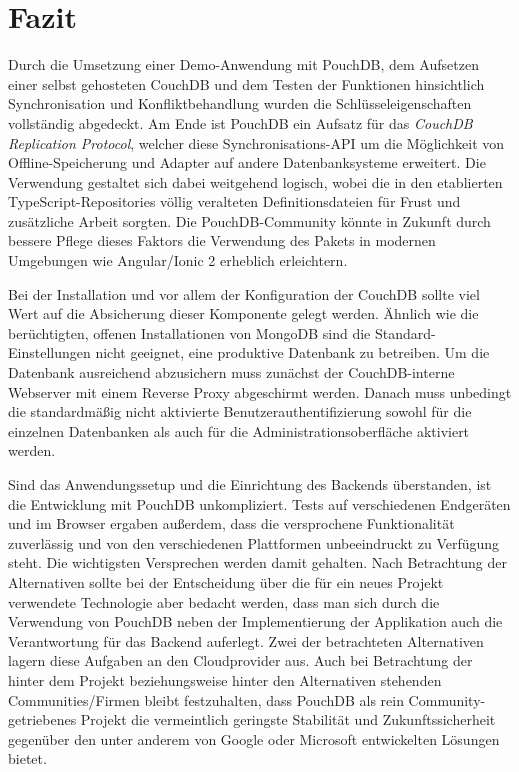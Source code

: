 \chapter{Fazit}
\label{Fazit}
Durch die Umsetzung einer Demo-Anwendung mit PouchDB, dem Aufsetzen einer selbst gehosteten CouchDB und dem Testen der Funktionen hinsichtlich Synchronisation und Konfliktbehandlung wurden die Schlüsseleigenschaften vollständig abgedeckt. Am Ende ist PouchDB ein Aufsatz für das \emph{CouchDB Replication Protocol}, welcher diese Synchronisations-API um die Möglichkeit von Offline-Speicherung und Adapter auf andere Datenbanksysteme erweitert. Die Verwendung gestaltet sich dabei weitgehend logisch, wobei die in den etablierten TypeScript-Repositories völlig veralteten Definitionsdateien für Frust und zusätzliche Arbeit sorgten. Die PouchDB-Community könnte in Zukunft durch bessere Pflege dieses Faktors die Verwendung des Pakets in modernen Umgebungen wie Angular/Ionic 2 erheblich erleichtern.

Bei der Installation und vor allem der Konfiguration der CouchDB sollte viel Wert auf die Absicherung dieser Komponente gelegt werden. Ähnlich wie die berüchtigten, offenen Installationen von MongoDB sind die Standard-Einstellungen nicht geeignet, eine produktive Datenbank zu betreiben. Um die Datenbank ausreichend abzusichern muss zunächst der CouchDB-interne Webserver mit einem Reverse Proxy abgeschirmt werden. Danach muss unbedingt die standardmäßig nicht aktivierte Benutzerauthentifizierung sowohl für die einzelnen Datenbanken als auch für die Administrationsoberfläche aktiviert werden.

Sind das Anwendungssetup und die Einrichtung des Backends überstanden, ist die Entwicklung mit PouchDB unkompliziert. Tests auf verschiedenen Endgeräten und im Browser ergaben außerdem, dass die versprochene Funktionalität zuverlässig und von den verschiedenen Plattformen unbeeindruckt zu Verfügung steht. Die wichtigsten Versprechen werden damit gehalten.
Nach Betrachtung der Alternativen sollte bei der Entscheidung über die für ein neues Projekt verwendete Technologie aber bedacht werden, dass man sich durch die Verwendung von PouchDB neben der Implementierung der Applikation auch die Verantwortung für das Backend auferlegt. Zwei der betrachteten Alternativen lagern diese Aufgaben an den Cloudprovider aus. Auch bei Betrachtung der hinter dem Projekt beziehungsweise hinter den Alternativen stehenden Communities/Firmen bleibt festzuhalten, dass PouchDB als rein Community-getriebenes Projekt die vermeintlich geringste Stabilität und Zukunftssicherheit gegenüber den unter anderem von Google oder Microsoft entwickelten Lösungen bietet.
